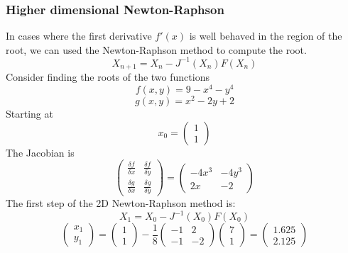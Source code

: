 \subsubsection{Higher dimensional Newton-Raphson}
In cases where the first derivative $f'(x)$ is well behaved in the region of the root, we can used the Newton-Raphson method to compute the root. 
\begin{equation}
    X_{n+1} = X_n - J^{-1}(X_n)F(X_n)
\end{equation}
Consider finding the roots of the two functions
$$
    f(x,y) = 9- x^4-y^4
$$
$$
    g(x,y) = x^2-2y+2
$$
Starting at
$$
    x_0 = \begin{pmatrix} 1 \\ 1 \end{pmatrix}
$$
The Jacobian is 
$$
    \begin{pmatrix} \frac{\delta f}{\delta x} & \frac{\delta f}{\delta y} \\ \frac{\delta g}{\delta x} & \frac{\delta g}{\delta y} \end{pmatrix} = \begin{pmatrix} -4x^3 & -4y^3 \\ 2x & -2 \end{pmatrix}
$$
The first step of the 2D Newton-Raphson method is:
\begin{equation*}
    X_{1} = X_0 - J^{-1}(X_0)F(X_0)
\end{equation*}
\begin{equation*}
   \begin{pmatrix} x_1 \\ y_1 \end{pmatrix} =  \begin{pmatrix} 1 \\ 1 \end{pmatrix} - \frac{1}{8} \begin{pmatrix} -1 & 2 \\ -1 & -2 \end{pmatrix}\begin{pmatrix} 7 \\ 1 \end{pmatrix} = \begin{pmatrix} 1.625 \\ 2.125 \end{pmatrix}
\end{equation*}
